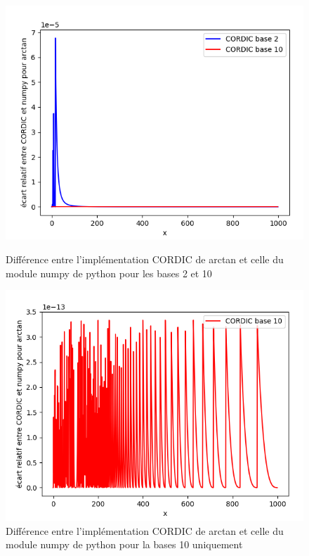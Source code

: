 \documentclass{article}
\begin{document}
\begin{figure}[!htb]
    \begin{minipage}{0.48\textwidth}
        \centering
        \includegraphics[scale=0.35]{images/ecart_atan.png}
        \caption{Différence entre l'implémentation CORDIC de arctan et celle du module numpy de python pour les bases 2 et 10}
        \label{fig:figure_tan_moins_tan}
    \end{minipage}\hfill
    \begin{minipage}{0.48\textwidth}
        \centering
        \includegraphics[scale=0.35]{images/ecart_arctan_base10.png}
        \caption{Différence entre l'implémentation CORDIC de arctan et celle du module numpy de python pour la bases 10 uniquement}
        \label{fig:figure_compare_log}
    \end{minipage}
\end{figure}
\end{document}
